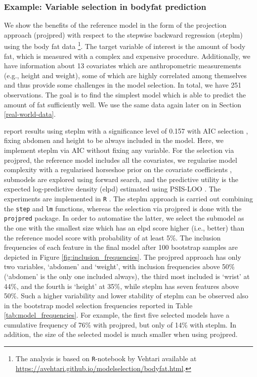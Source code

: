 \documentclass[american,]{article}
\let\rmarkdownfootnote\footnote%
\def\footnote{\protect\rmarkdownfootnote}
\theoremstyle{definition}
\begin{document}
\subsubsection{Example: Variable selection in bodyfat prediction}

We show the benefits of the reference model in the form of the
projection approach (projpred) with respect to the stepwise backward
regression (steplm) using the body fat data
\citep{johnson1996fitting}\footnote{The analysis is based on
  \texttt{R}-notebook by Vehtari available at
  \url{https://avehtari.github.io/modelselection/bodyfat.html}.}. The
target variable of interest is the amount of body fat, which is
measured with a complex and expensive procedure. Additionally, we have
information about 13 covariates which are anthropometric measurements
(e.g., height and weight), some of which are highly correlated among
themselves and thus provide some challenges in the model selection. In
total, we have 251 observations. The goal is to find the simplest
model which is able to predict the amount of fat sufficiently well. We
use the same data again later on in Section \ref{real-world-data}.

\cite{paper:bodyfat} report results using steplm with a significance
level of 0.157 with AIC selection \citep{akaike1974new}, fixing
abdomen and height to be always included in the model. Here, we
implement steplm via AIC without fixing any variable. For the
selection via projpred, the reference model includes all the
covariates, we regularise model complexity with a regularised
horseshoe prior on the covariate coefficients \citep{paper:rhs},
submodels are explored using forward search, and the predictive
utility is the expected log-predictive density (elpd) estimated using
PSIS-LOO \citep{paper:psis_loo}. The experiments are implemented in
\texttt{R} \citep{Rcore2018}. The steplm approach is carried out
combining the \texttt{step} and \texttt{lm} functions, whereas the
selection via projpred is done with the \texttt{projpred} package. In
order to automatise the latter, we select the submodel as the one with
the smallest size which has an elpd score higher (i.e., better) than
the reference model score with probability of at least 5\%. The
inclusion frequencies of each feature in the final model after 100
bootstrap samples are depicted in Figure
\ref{fig:inclusion_frequencies}. The projpred approach has only two
variables, `abdomen' and `weight', with inclusion frequencies above
50\% (`abdomen' is the only one included always), the third most
included is `wrist' at 44\%, and the fourth is `height' at 35\%, while
steplm has seven features above 50\%. Such a higher variability and
lower stability of steplm can be observed also in the bootstrap model
selection frequencies reported in Table
\ref{tab:model_frequencies}. For example, the first five selected
models have a cumulative frequency of 76\% with projpred, but only of
14\% with steplm. In addition, the size of the selected model is much
smaller when using projpred.
\end{document}
